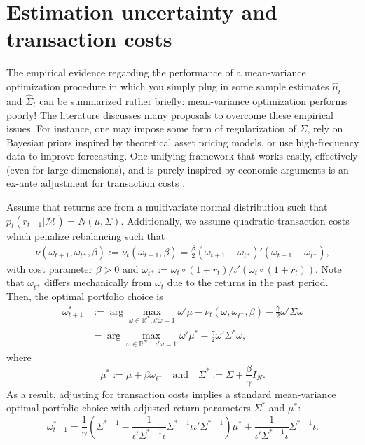 \documentclass[
]{krantz}
\begin{document}
\hypertarget{estimation-uncertainty-and-transaction-costs}{%
\section{Estimation uncertainty and transaction costs}\label{estimation-uncertainty-and-transaction-costs}}

The empirical evidence regarding the performance of a mean-variance optimization procedure in which you simply plug in some sample estimates \(\hat \mu_t\) and \(\hat \Sigma_t\) can be summarized rather briefly: mean-variance optimization performs poorly! The literature discusses many proposals to overcome these empirical issues. For instance, one may impose some form of regularization of \(\Sigma\), rely on Bayesian priors inspired by theoretical asset pricing models, or use high-frequency data to improve forecasting. One unifying framework that works easily, effectively (even for large dimensions), and is purely inspired by economic arguments is an ex-ante adjustment for transaction costs \citep{Hautsch2019}.

Assume that returns are from a multivariate normal distribution such that \(p_t({r}_{t+1}|\mathcal{M})=N(\mu,\Sigma)\). Additionally, we assume quadratic transaction costs which penalize rebalancing such that \[
\begin{aligned}
\nu\left(\omega_{t+1},\omega_{t^+}, \beta\right) :=\nu_t\left(\omega_{t+1}, \beta\right) = \frac{\beta}{2} \left(\omega_{t+1} - \omega_{t^+}\right)'\left(\omega_{t+1}- \omega_{t^+}\right),\end{aligned}\]
with cost parameter \(\beta>0\) and \(\omega_{t^+} := {\omega_t \circ (1 +r_{t})}/{\iota' (\omega_t \circ (1 + r_{t}))}\). Note that \(\omega_{t^+}\) differs mechanically from \(\omega_t\) due to the returns in the past period.\\
Then, the optimal portfolio choice is
\[\begin{aligned}\omega_{t+1} ^* &:=  \arg\max_{\omega \in \mathbb{R}^N,  \iota'\omega = 1} \omega'\mu - \nu_t (\omega,\omega_{t^+}, \beta) - \frac{\gamma}{2}\omega'\Sigma\omega \\
&=\arg\max_{\omega\in\mathbb{R}^N,\text{ }  \iota'\omega=1}
\omega'\mu^* - \frac{\gamma}{2}\omega'\Sigma^* \omega ,\end{aligned}\]
where
\[\mu^*:=\mu+\beta \omega_{t^+} \quad  \text{and} \quad \Sigma^*:=\Sigma + \frac{\beta}{\gamma} I_N.
\]
As a result, adjusting for transaction costs implies a standard mean-variance optimal portfolio choice with adjusted return parameters \(\Sigma^*\) and \(\mu^*\): \[\omega^*_{t+1} = \frac{1}{\gamma}\left(\Sigma^{*-1} - \frac{1}{\iota' \Sigma^{*-1}\iota }\Sigma^{*-1}\iota\iota' \Sigma^{*-1} \right) \mu^*  + \frac{1}{\iota' \Sigma^{*-1} \iota }\Sigma^{*-1} \iota.\]
\end{document}
